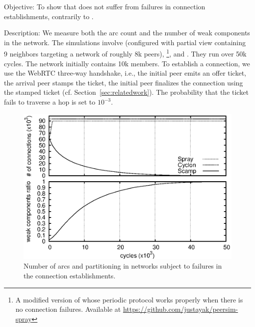 \begin{asparadesc}
\item[Objective:] To show that \SPRAY does not suffer from failures in
  connection establishments, contrarily to \SCAMP.
\item[Description:] We measure both the arc count and the number of weak
  components in the network. The simulations involve \CYCLON (configured with
  partial view containing 9 neighbors targeting a network of roughly 8k
  peers), \SCAMP\footnote{A modified version of \SCAMP whose periodic protocol
    works properly when there is no connection failures. Available at
    \url{https://github.com/justayak/peersim-spray}}, and \SPRAY. They run over
  50k cycles. The network initially contains 10k members.  To establish a
  connection, we use the WebRTC three-way handshake, i.e., the initial peer
  emits an offer ticket, the arrival peer stamps the ticket, the initial peer
  finalizes the connection using the stamped ticket
  (cf. Section~\ref{sec:relatedwork}). The probability that the ticket fails to
  traverse a hop is set to $10^{-3}$.

\begin{figure}
  \centering \includegraphics[width=\SCALE\textwidth]{img/degen.eps}
  \caption{\label{fig:degeneration}Number of arcs and partitioning in networks
    subject to failures in the connection establishments.}
\end{figure}


\end{asparadesc}
